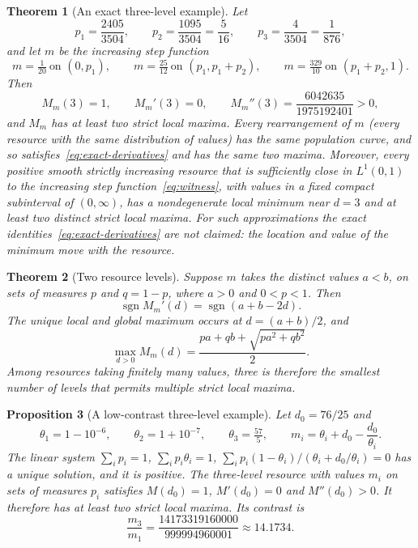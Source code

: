 \documentclass[11pt]{article}
\newtheorem{theorem}{Theorem}
\newtheorem{proposition}[theorem]{Proposition}
\theoremstyle{remark}
\newcommand{\sgn}{\operatorname{sgn}}
\begin{document}
\begin{theorem}[An exact three-level example]\label{thm:exact}
Let
\[
 p_1=\frac{2405}{3504},\qquad
 p_2=\frac{1095}{3504}=\frac5{16},\qquad
 p_3=\frac4{3504}=\frac1{876},
\]
and let \(m\) be the increasing step function
\begin{equation}\label{eq:witness}
 m=\tfrac1{20}\ \text{on }(0,p_1),\qquad
 m=\tfrac{25}{12}\ \text{on }(p_1,p_1+p_2),\qquad
 m=\tfrac{329}{10}\ \text{on }(p_1+p_2,1).
\end{equation}
Then
\begin{equation}\label{eq:exact-derivatives}
 M_m(3)=1,\qquad M_m'(3)=0,\qquad
 M_m''(3)=\frac{6042635}{1975192401}>0,
\end{equation}
and \(M_m\) has at least two strict local maxima. Every rearrangement of
\(m\) (every resource with the same distribution of values) has the same
population curve, and so satisfies~\eqref{eq:exact-derivatives} and has
the same two maxima. Moreover, every positive smooth strictly increasing
resource that is sufficiently close in \(L^1(0,1)\) to the increasing step
function~\eqref{eq:witness}, with values in a fixed compact subinterval of
\((0,\infty)\), has a nondegenerate local minimum near \(d=3\) and at least
two distinct strict local maxima. For such approximations the exact
identities~\eqref{eq:exact-derivatives} are not claimed: the location and
value of the minimum move with the resource.
\end{theorem}

\begin{theorem}[Two resource levels]\label{thm:two}
Suppose \(m\) takes the distinct values \(a<b\), on sets of measures
\(p\) and \(q=1-p\), where \(a>0\) and \(0<p<1\). Then
\begin{equation}\label{eq:two-sign}
 \sgn M_m'(d)=\sgn(a+b-2d).
\end{equation}
The unique local and global maximum occurs at \(d=(a+b)/2\), and
\begin{equation}\label{eq:two-max}
 \max_{d>0}M_m(d)
   =\frac{pa+qb+\sqrt{pa^2+qb^2}}2 .
\end{equation}
Among resources taking finitely many values, three is therefore the
smallest number of levels that permits multiple strict local maxima.
\end{theorem}

\begin{proposition}[A low-contrast three-level example]\label{prop:lowcontrast}
Let \(d_0=76/25\) and
\[
 \theta_1=1-10^{-6},\qquad \theta_2=1+10^{-7},\qquad
 \theta_3=\tfrac{57}{5},\qquad
 m_i=\theta_i+d_0-\frac{d_0}{\theta_i}.
\]
The linear system
\(\sum_ip_i=1\), \(\sum_ip_i\theta_i=1\),
\(\sum_ip_i(1-\theta_i)/(\theta_i+d_0/\theta_i)=0\)
has a unique solution, and it is positive. The three-level resource with
values \(m_i\) on sets of measures \(p_i\) satisfies \(M(d_0)=1\),
\(M'(d_0)=0\) and \(M''(d_0)>0\). It therefore has at least two strict
local maxima. Its contrast is
\[
 \frac{m_3}{m_1}=\frac{14173319160000}{999994960001}\approx 14.1734 .
\]
\end{proposition}
\end{document}
